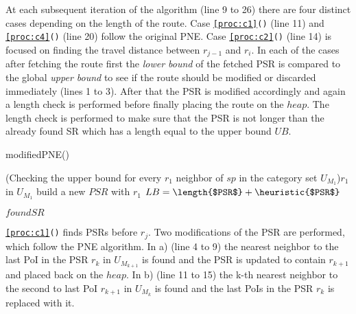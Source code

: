 At each subsequent iteration of the algorithm \texttt{} (line 9 to 26) there are four distinct cases depending on the length of the route. Case \newline \texttt{\ref{proc:c1}()} (line 11) and \texttt{\ref{proc:c4}()} (line 20) follow the original PNE. Case \texttt{\ref{proc:c2}()} (line 14) is focused on finding the travel distance between $r_{j-1}$ and $r_i$. In each of the cases after fetching the route first the \textit{lower bound} of the fetched PSR is compared to the global \textit{upper bound} to see if the route should be modified or discarded immediately (lines 1 to 3). After that the PSR is modified accordingly and again a length check is performed before finally placing the route on the $heap$. The length check is performed to make sure that the PSR is not longer than the already found SR which has a length equal to the upper bound $UB$.  

\begin{algorithm}[htb!]
\caption{modifiedPNE()}
\label{alg:mPNE}
	
	\ForEach(Checking the upper bound for every $r_1$ neighbor of $sp$ in the category set $U_{M_1}$){$r_1$ in $U_{M_1}$}{
		build a new $PSR$ with $r_1$\;
		$LB = \length{$PSR$} + \heuristic{$PSR$}$\;
	}
	
	
	\Return $foundSR$
	
\end{algorithm}

\texttt{\ref{proc:c1}()} finds PSRs before $r_j$. Two modifications of the PSR are performed, which follow the PNE algorithm. In a) (line 4 to 9) the nearest neighbor to the last PoI in the PSR $r_k$ in $U_{M_{k+1}}$ is found and the PSR is updated to contain $r_{k+1}$ and placed back on the $heap$. In b) (line 11 to 15) the k-th nearest neighbor to the second to last PoI $r_{k+1}$ in $U_{M_{k}}$ is found and the last PoIs in the PSR $r_k$ is replaced with it. \newline

